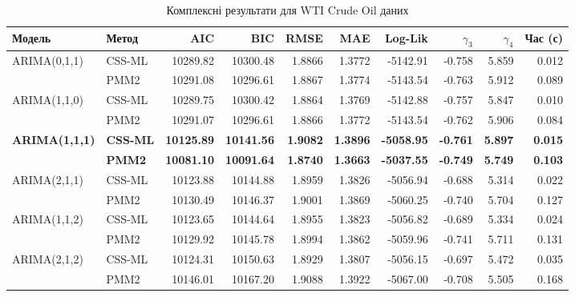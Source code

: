\documentclass[12pt,a4paper]{article}
\begin{document}
\begin{table}[htbp]
\centering
\begingroup
\setlength{\tabcolsep}{5pt} %
\scriptsize
\caption{Комплексні результати для WTI Crude Oil даних}
\label{tab:wti_comprehensive_results}
\begin{tabular}{@{}llrrrrrrrr@{}}
\toprule
\textbf{Модель} & \textbf{Метод} & \textbf{AIC} & \textbf{BIC} & \textbf{RMSE} & \textbf{MAE} & \textbf{Log-Lik} & $\gamma_3$ & $\gamma_4$ & \textbf{Час (с)} \\
\midrule
ARIMA(0,1,1) & CSS-ML & 10289.82 & 10300.48 & 1.8866 & 1.3772 & -5142.91 & -0.758 & 5.859 & 0.012 \\
             & PMM2   & 10291.08 & 10296.61 & 1.8867 & 1.3774 & -5143.54 & -0.763 & 5.912 & 0.089 \\
\midrule
ARIMA(1,1,0) & CSS-ML & 10289.75 & 10300.42 & 1.8864 & 1.3769 & -5142.88 & -0.757 & 5.847 & 0.010 \\
             & PMM2   & 10291.07 & 10296.61 & 1.8866 & 1.3772 & -5143.54 & -0.762 & 5.906 & 0.084 \\
\midrule
\rowcolor{yellow!20}
\textbf{ARIMA(1,1,1)} & \textbf{CSS-ML} & \textbf{10125.89} & \textbf{10141.56} & \textbf{1.9082} & \textbf{1.3896} & \textbf{-5058.95} & \textbf{-0.761} & \textbf{5.897} & \textbf{0.015} \\
\rowcolor{green!20}
             & \textbf{PMM2}   & \textbf{10081.10} & \textbf{10091.64} & \textbf{1.8740} & \textbf{1.3663} & \textbf{-5037.55} & \textbf{-0.749} & \textbf{5.749} & \textbf{0.103} \\
\midrule
ARIMA(2,1,1) & CSS-ML & 10123.88 & 10144.88 & 1.8959 & 1.3826 & -5056.94 & -0.688 & 5.314 & 0.022 \\
             & PMM2   & 10130.49 & 10146.37 & 1.9001 & 1.3869 & -5060.25 & -0.740 & 5.704 & 0.127 \\
\midrule
ARIMA(1,1,2) & CSS-ML & 10123.65 & 10144.64 & 1.8955 & 1.3823 & -5056.82 & -0.689 & 5.334 & 0.024 \\
             & PMM2   & 10129.92 & 10145.78 & 1.8994 & 1.3862 & -5059.96 & -0.741 & 5.711 & 0.131 \\
\midrule
ARIMA(2,1,2) & CSS-ML & 10124.31 & 10150.63 & 1.8929 & 1.3807 & -5056.15 & -0.697 & 5.472 & 0.035 \\
             & PMM2   & 10146.01 & 10167.20 & 1.9088 & 1.3922 & -5067.00 & -0.708 & 5.505 & 0.168 \\
\bottomrule
\end{tabular}
\endgroup
\end{table}
\end{document}
